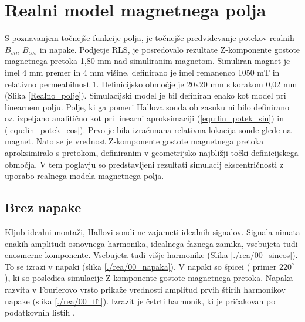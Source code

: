 \chapter{Realni model magnetnega polja}
S poznavanjem točnejše funkcije polja, je točnejše predvidevanje potekov realnih $B_{sin}$ $B_{cos}$ in napake. Podjetje RLS,  je posredovalo rezultate Z-komponente gostote magnetnega pretoka 1,80 mm nad simuliranim magnetom. Simuliran magnet je imel 4 mm premer in 4 mm višine. definirano je imel remanenco 1050 mT in relativno permeabilnost 1.  Definicijsko območje  je 20x20 mm s korakom 0,02 mm (Slika \ref{Realno_polje}).
Simulacijski model je bil definiran enako kot model pri linearnem polju.
Polje, ki ga pomeri Hallova sonda ob zasuku ni bilo definirano oz. izpeljano analitično kot pri linearni aproksimaciji (\ref{equ:lin_potek_sin}) in (\ref{equ:lin_potek_cos}).  Prvo je bila izračunana relativna lokacija sonde glede na magnet. Nato se je vrednost Z-komponente gostote magnetnega pretoka  aproksimiralo s pretokom, definiranim v geometrijsko najbližji točki definicijskega območja. V tem poglavju so predstavljeni rezultati simulacij ekscentričnosti z uporabo realnega modela magnetnega polja.
\section{Brez napake}
Kljub idealni montaži, Hallovi sondi ne zajameti idealnih signalov. Signala nimata enakih amplitudi osnovnega harmonika, idealnega faznega zamika, vsebujeta tudi enosmerne komponente. Vsebujeta tudi višje harmonike (Slika \ref{./rea/00_sincos}). To se izrazi v napaki (slika \ref{./rea/00_napaka}). V napaki so špicei ( primer $220^{\circ}$ ), ki so posledica simulacije Z-komponente gostote  magnetnega pretoka. Napaka razvita v Fourierovo vrsto prikaže vrednosti amplitud prvih štirih harmonikov napake (slika \ref{./rea/00_fft}). Izrazit je četrti harmonik, ki je pričakovan po podatkovnih listih \cite{AM8192}.
\newpage
